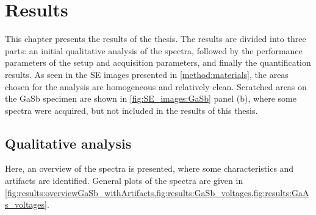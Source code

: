 \chapter{Results}
\label{ch:results}



This chapter presents the results of the thesis.
The results are divided into three parts: an initial qualitative analysis of the spectra, followed by the performance parameters of the setup and acquisition parameters, and finally the quantification results.
As seen in the SE images presented in \cref{method:materials}, the areas chosen for the analysis are homogeneous and relatively clean.
Scratched areas on the GaSb specimen are shown in \cref{fig:SE_images:GaSb} panel (b), where some spectra were acquired, but not included in the results of this thesis.



\section{Qualitative analysis}
\label{results:qualitative_analysis}

Here, an overview of the spectra is presented, where some characteristics and artifacts are identified.
General plots of the spectra are given in \cref{fig:results:overviewGaSb_withArtifacts,fig:results:GaSb_voltages,fig:results:GaAs_voltages}.

